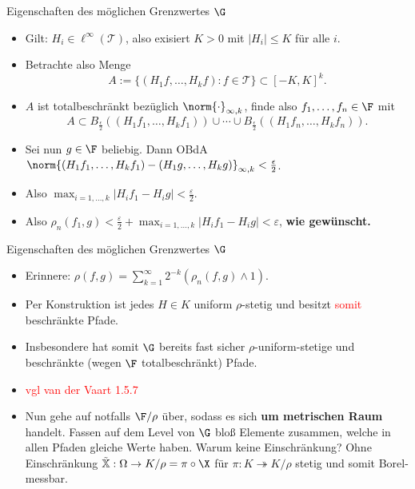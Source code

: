\begin{frame}{Eigenschaften des möglichen Grenzwertes $\G$}
    \begin{proofs}
        \begin{itemize}
            \begin{itemize}
                \item Gilt: $H_i \in \ell^\infty(\mathcal{T})$, also exisiert $K > 0$ mit $|H_i| \leq K$ für alle $i$.
                \item Betrachte also Menge \[
A := \{(H_1f, \ldots, H_kf) : f \in \mathcal{T}\} \subset [-K,K]^k.
                \]
                \item $A$ ist totalbeschränkt bezüglich $\norm{\cdot}_{\infty,k}$, finde also $f_1, \ldots, f_n \in \F$ mit \[
A \subset B_{\frac{\epsilon}{2}}((H_1 f_1, \ldots, H_k f_1)) \cup \cdots \cup B_{\frac{\epsilon}{2}}((H_1 f_n, \ldots, H_k f_n)).
                \]    \pause
                \item Sei nun $g \in \F$ beliebig. Dann OBdA $\norm{(H_1 f_1, \ldots, H_k f_1)-(H_1 g, \ldots, H_k g)}_{\infty, k} < \frac{\epsilon}{2}$.
                \item Also $\max_{i=1, \ldots, k} |H_i f_1 - H_i g| < \frac{\varepsilon}{2}$.
                \item Also $\rho_n(f_1, g) < \frac{\varepsilon}{2} + \max_{i=1, \ldots, k} |H_i f_1 - H_i g| < \varepsilon$,\textbf{ wie gewünscht.}
            \end{itemize}
        \end{itemize}
    \end{proofs}
\end{frame}
\begin{frame}{Eigenschaften des möglichen Grenzwertes $\G$}
    \begin{itemize}
        \item Erinnere: $\rho(f,g) = \sum_{k=1}^\infty 2^{-k}(\rho_n(f,g) \wedge 1)$.
        \item Per Konstruktion ist jedes $H \in K$ uniform $\rho$-stetig und besitzt \textcolor{red}{somit} beschränkte Pfade.
        \item Insbesondere hat somit $\G$ bereits fast sicher $\rho$-uniform-stetige und beschränkte (wegen $\F$ totalbeschränkt) Pfade.
        \pause
        \item \textcolor{red}{vgl van der Vaart 1.5.7}
        \item Nun gehe auf notfalls $\F / \rho$ über, sodass es sich \textbf{um metrischen Raum} handelt. 
        Fassen auf dem Level von $\G$ bloß Elemente zusammen, welche in allen Pfaden gleiche Werte haben. 
        \small Warum keine Einschränkung?
        \pause
        Ohne Einschränkung $\tilde{\mathbb{X}}: \Omega \to K / \rho = \pi \circ \X $ für $\pi: K \twoheadrightarrow K / \rho$ stetig und somit Borel-messbar. 
        \normalsize
        \pause
        



        \end{itemize}   
\end{frame}
